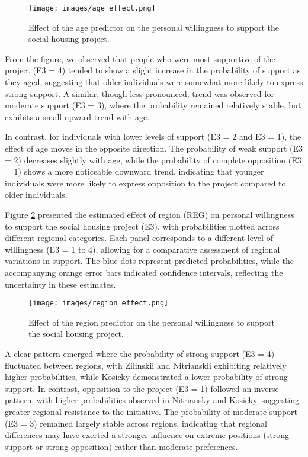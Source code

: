 \documentclass[titlepage]{article}
\begin{document}
\begin{figure}[H]
    \centering
    \texttt{[image: images/age\_effect.png]}
    \caption{Effect of the age predictor on the personal willingness to support the social housing project.}
    \label{fig:age_effect}
\end{figure}

\justify
From the figure, we observed that people who were most supportive of the project (E3 = 4) tended to show a slight increase in the probability of support as they aged, suggesting that older individuals were somewhat more likely to express strong support. A similar, though less pronounced, trend was observed for moderate support (E3 = 3), where the probability remained relatively stable, but exhibits a small upward trend with age.

\justify
In contrast, for individuals with lower levels of support (E3 = 2 and E3 = 1), the effect of age moves in the opposite direction. The probability of weak support (E3 = 2) decreases slightly with age, while the probability of complete opposition (E3 = 1) shows a more noticeable downward trend, indicating that younger individuals were more likely to express opposition to the project compared to older individuals.

\justify
Figure \ref{fig:reg_effect} presented the estimated effect of region (REG) on personal willingness to support the social housing project (E3), with probabilities plotted across different regional categories. Each panel corresponds to a different level of willingness (E3 = 1 to 4), allowing for a comparative assessment of regional variations in support. The blue dots represent predicted probabilities, while the accompanying orange error bars indicated confidence intervals, reflecting the uncertainty in these estimates.

\begin{figure}[H]
    \centering
    \texttt{[image: images/region\_effect.png]}
    \caption{Effect of the region predictor on the personal willingness to support the social housing project.}
    \label{fig:reg_effect}
\end{figure}

\justify
A clear pattern emerged where the probability of strong support (E3 = 4) fluctuated between regions, with Zilinskii and Nitrianskii exhibiting relatively higher probabilities, while Kosicky demonstrated a lower probability of strong support. In contrast, opposition to the project (E3 = 1) followed an inverse pattern, with higher probabilities observed in Nitriansky and Kosicky, suggesting greater regional resistance to the initiative. The probability of moderate support (E3 = 3) remained largely stable across regions, indicating that regional differences may have exerted a stronger influence on extreme positions (strong support or strong opposition) rather than moderate preferences.
\end{document}
